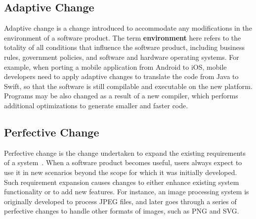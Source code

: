 \documentclass[runningheads,a4paper]{llncs}
\begin{document}
\subsection{Adaptive Change}
Adaptive change is a change introduced to accommodate any modifications in the environment of a software product. The term \textbf{environment} here refers to the totality of all conditions that influence the software product, including business rules, government policies, and software and hardware operating systems. For example, when porting a mobile application from Android to iOS, mobile developers need to apply adaptive changes to translate the code from Java to Swift, so that the software is still compilable and executable on the new platform. Programs may be also changed as a result of a new compiler, which performs additional optimizations to generate smaller and faster code. 

\subsection{Perfective Change}

Perfective change is the change undertaken to expand the existing requirements of a system~\cite{Seaman2008:SMC}. When a software product becomes useful, users always expect to use it in new scenarios beyond the scope for which it was initially developed. Such requirement expansion causes changes to either enhance existing system functionality or to add new features. For instance, an image processing system is originally developed to process JPEG files, and later goes through a series of perfective changes to handle other formats of images, such as PNG and SVG.
\end{document}
